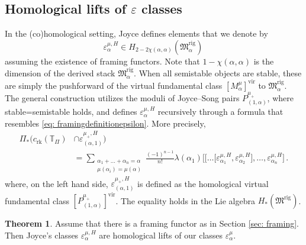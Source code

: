 \documentclass[12pt]{amsart}
\theoremstyle{definition}
\newtheorem{theorem}[definition]{Theorem}
\newcommand{\BT}{{\mathbb{T}}}
\newcommand{\1}{\mathbf 1}
\newcommand{\FM}{{\mathfrak{M}}}
\newcommand{\vir}{\mathrm{vir}}
\newcommand{\rk}{\mathrm{rk}}
\newcommand{\rig}{\mathrm{rig}}
\begin{document}
\subsection{Homological lifts of $\varepsilon$ classes}\label{subsec: homliftsepsilon}
In the (co)homological setting, Joyce defines elements that we denote by
\[\varepsilon_\alpha^{\mu, H}\in H_{2-2\chi(\alpha, \alpha)}(\FM^\rig_\alpha)\,\]
assuming the existence of framing functors. Note that $1-\chi(\alpha, \alpha)$ is the dimension of the derived stack $\FM^\rig_\alpha$. When all semistable objects are stable, these are simply the pushforward of the virtual fundamental class $[M_\alpha^\mu]^\vir$ to $\FM^\rig_\alpha$. The general construction utilizes the moduli of Joyce--Song pairs $P_{(1,\alpha)}^{\mu_+}$, where stable=semistable holds, and defines $\varepsilon_\alpha^{\mu, H}$ recursively through a formula that resembles \eqref{eq: framingdefinitionepsilon}. More precisely,
    \begin{align}\label{eq: framingdefinitionepsilonhomology}
        \Pi_\ast\big(c_{\rk}(\BT_\Pi)&\cap \varepsilon_{(\alpha, 1)}^{\mu_+, H}\big)\\&=\sum_{\substack{\alpha_{1}+\ldots+\alpha_n=\alpha\\
        \mu(\alpha_i)=\mu(\alpha)}}\frac{(-1)^{n-1}}{n!}\lambda(\alpha_1)\big[\big[\ldots\big[\varepsilon_{\alpha_1}^{\mu, H},\varepsilon_{\alpha_2}^{\mu, H}\big],\ldots, \varepsilon_{\alpha_n}^{\mu, H}\big]\,. \nonumber
    \end{align}
    where, on the left hand side, $\varepsilon_{(\alpha, 1)}^{\mu_+, H}$ is defined as the homological virtual fundamental class $[P_{(1,\alpha)}^{\mu_+}]^\vir$. The equality holds in the Lie algebra $H_\ast(\FM^\rig)$.
\begin{theorem}\label{thm: homliftsjoyce}
    Assume that there is a framing functor as in Section \ref{sec: framing}. Then Joyce's classes $\varepsilon^{\mu, H}_\alpha$ are homological lifts of our classes $\varepsilon_\alpha^\mu$. 
\end{theorem}
\end{document}
